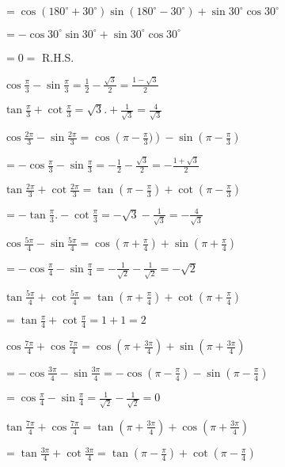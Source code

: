   $= \cos(180^\circ + 30^\circ)\sin(180^\circ - 30^\circ) + \sin 30^\circ\cos 30^\circ$

  $= -\cos 30^\circ\sin 30^\circ + \sin 30^\circ\cos 30^\circ$

  $= 0 =$ R.H.S.

\item $\cos \frac{\pi}{3} - \sin \frac{\pi}{3} = \frac{1}{2} - \frac{\sqrt{3}}{2} = \frac{1 - \sqrt{3}}{2}$

  $\tan\frac{\pi}{3} + \cot\frac{\pi}{3} = \sqrt{3}. + \frac{1}{\sqrt{3}} = \frac{4}{\sqrt{3}}$

\item $\cos\frac{2\pi}{3} -\sin\frac{2\pi}{3} = \cos\left(\pi - \frac{\pi}{3})\right) - \sin\left(\pi - \frac{\pi}{3}\right)$

  $= -\cos \frac{\pi}{3} - \sin\frac{\pi}{3} = -\frac{1}{2} - \frac{\sqrt{3}}{2} = - \frac{1 + \sqrt{3}}{2}$

  $\tan\frac{2\pi}{3} + \cot\frac{2\pi}{3} = \tan\left(\pi - \frac{\pi}{3}\right) + \cot\left(\pi - \frac{\pi}{3}\right)$

  $= -\tan \frac{\pi}{3}. -\cot \frac{\pi}{3} = -\sqrt{3} - \frac{1}{\sqrt{3}} = -\frac{4}{\sqrt{3}}$

\item $\cos\frac{5\pi}{4} - \sin\frac{5\pi}{4} = \cos\left(\pi + \frac{\pi}{4}\right) + \sin \left(\pi + \frac{\pi}{4}\right)$

  $= -\cos \frac{\pi}{4} - \sin \frac{\pi}{4} = -\frac{1}{\sqrt{2}} - \frac{1}{\sqrt{2}} = -\sqrt{2}$

  $\tan \frac{5\pi}{4} + \cot \frac{5\pi}{4} = \tan\left(\pi + \frac{\pi}{4}\right) + \cot\left(\pi + \frac{\pi}{4}\right)$

  $= \tan \frac{\pi}{4} + \cot \frac{\pi}{4} = 1 + 1 = 2$

\item $\cos\frac{7\pi}{4} + \cos\frac{7\pi}{4} = \cos \left(\pi + \frac{3\pi}{4}\right) + \sin\left(\pi +
  \frac{3\pi}{4}\right)$

  $= -\cos\frac{3\pi}{4} - \sin\frac{3\pi}{4} = -\cos\left(\pi - \frac{\pi}{4}\right) -\sin \left(\pi -
  \frac{\pi}{4}\right)$

  $= \cos \frac{\pi}{4} -\sin \frac{\pi}{4} = \frac{1}{\sqrt{2}} - \frac{1}{\sqrt{2}} = 0$

  $\tan \frac{7\pi}{4} + \cos \frac{7\pi}{4} = \tan\left(\pi + \frac{3\pi}{4}\right) + \cos \left(\pi +
  \frac{3\pi}{4}\right)$

  $= \tan \frac{3\pi}{4} + \cot \frac{3\pi}{4} = \tan\left(\pi - \frac{\pi}{4}\right) + \cot \left(\pi -
  \frac{\pi}{4}\right)$

